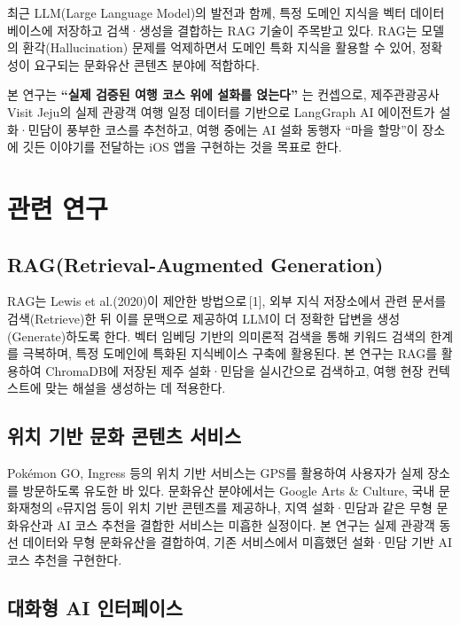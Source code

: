 \documentclass[10pt,twocolumn,a4paper]{article}
\begin{document}
최근 LLM(Large Language Model)의 발전과 함께, 특정 도메인 지식을 벡터
데이터베이스에 저장하고 검색·생성을 결합하는 RAG 기술이 주목받고 있다.
RAG는 모델의 환각(Hallucination) 문제를 억제하면서 도메인 특화 지식을
활용할 수 있어, 정확성이 요구되는 문화유산 콘텐츠 분야에 적합하다.

본 연구는 \textbf{``실제 검증된 여행 코스 위에 설화를 얹는다''} 는 컨셉으로,
제주관광공사 Visit Jeju의 실제 관광객 여행 일정 데이터를 기반으로 LangGraph
AI 에이전트가 설화·민담이 풍부한 코스를 추천하고, 여행 중에는 AI 설화 동행자
``마을 할망''이 장소에 깃든 이야기를 전달하는 iOS 앱을 구현하는 것을 목표로 한다.

\section{관련 연구}

\subsection{RAG(Retrieval-Augmented Generation)}

RAG는 Lewis et al.(2020)이 제안한 방법으로\,[1], 외부 지식 저장소에서 관련
문서를 검색(Retrieve)한 뒤 이를 문맥으로 제공하여 LLM이 더 정확한 답변을
생성(Generate)하도록 한다. 벡터 임베딩 기반의 의미론적 검색을 통해 키워드
검색의 한계를 극복하며, 특정 도메인에 특화된 지식베이스 구축에 활용된다.
본 연구는 RAG를 활용하여 ChromaDB에 저장된 제주 설화·민담을 실시간으로
검색하고, 여행 현장 컨텍스트에 맞는 해설을 생성하는 데 적용한다.

\subsection{위치 기반 문화 콘텐츠 서비스}

Pok\'{e}mon GO, Ingress 등의 위치 기반 서비스는 GPS를 활용하여 사용자가
실제 장소를 방문하도록 유도한 바 있다. 문화유산 분야에서는 Google Arts \&
Culture, 국내 문화재청의 e뮤지엄 등이 위치 기반 콘텐츠를 제공하나, 지역
설화·민담과 같은 무형 문화유산과 AI 코스 추천을 결합한 서비스는 미흡한
실정이다. 본 연구는 실제 관광객 동선 데이터와 무형 문화유산을 결합하여,
기존 서비스에서 미흡했던 설화·민담 기반 AI 코스 추천을 구현한다.

\subsection{대화형 AI 인터페이스}
\end{document}

